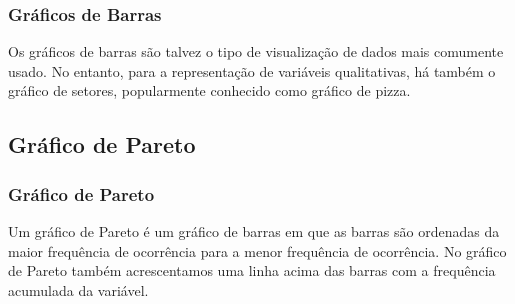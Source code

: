 \documentclass[14pt,aspectratio=1610]{beamer}
\begin{document}

\begin{frame}{}
\frametitle{Gráficos de Barras}
\begin{block}{}
\justifying
Os gráficos de barras são talvez o tipo de visualização de dados mais comumente usado. No entanto, para a representação de variáveis qualitativas, há também o gráfico de setores, popularmente conhecido como gráfico de pizza.
\end{block}
\end{frame}

\subsection{Gráfico de Pareto}
\begin{frame}{}
\frametitle{Gráfico de Pareto}
\begin{block}{}
\justifying
Um gráfico de Pareto é um gráfico de barras em que as barras são ordenadas da maior frequência de ocorrência para a menor frequência de ocorrência. No gráfico de Pareto também acrescentamos uma linha acima das barras com a frequência acumulada da variável.

\end{block}
\end{frame}
\end{document}
